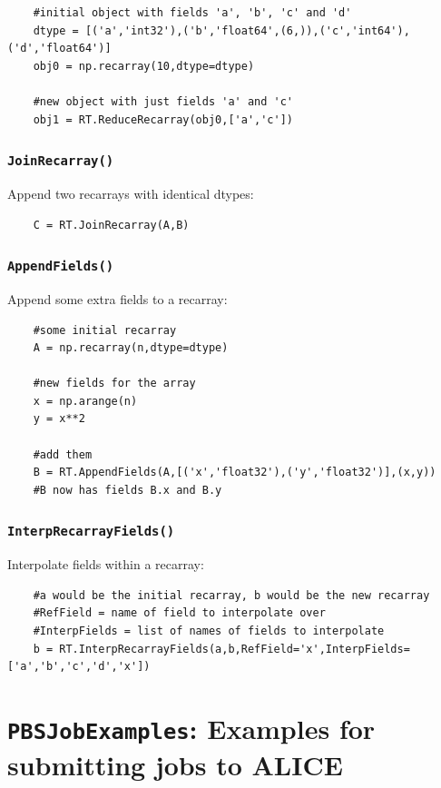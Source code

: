 	\begin{verbatim}
	#initial object with fields 'a', 'b', 'c' and 'd'
	dtype = [('a','int32'),('b','float64',(6,)),('c','int64'),('d','float64')]
	obj0 = np.recarray(10,dtype=dtype)
	
	#new object with just fields 'a' and 'c'
	obj1 = RT.ReduceRecarray(obj0,['a','c'])
	\end{verbatim}
	
	\subsubsection{\texttt{JoinRecarray()}}
	
	Append two recarrays with identical dtypes:
	
	\begin{verbatim}
	C = RT.JoinRecarray(A,B)
	\end{verbatim}
	
	\subsubsection{\texttt{AppendFields()}}
	
	Append some extra fields to a recarray:
	
	\begin{verbatim}
	#some initial recarray
	A = np.recarray(n,dtype=dtype)
	
	#new fields for the array
	x = np.arange(n)
	y = x**2
	
	#add them
	B = RT.AppendFields(A,[('x','float32'),('y','float32')],(x,y))
	#B now has fields B.x and B.y
	\end{verbatim}
	
	\subsubsection{\texttt{InterpRecarrayFields()}}
	
	Interpolate fields within a recarray:
	
	\begin{verbatim}
	#a would be the initial recarray, b would be the new recarray
	#RefField = name of field to interpolate over
	#InterpFields = list of names of fields to interpolate
	b = RT.InterpRecarrayFields(a,b,RefField='x',InterpFields=['a','b','c','d','x'])
	\end{verbatim}
	

	\section{\texttt{PBSJobExamples}: Examples for submitting jobs to ALICE}


